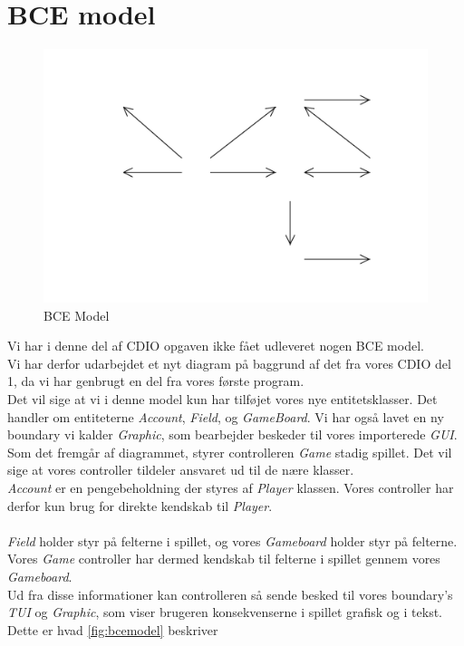 \section{BCE model}
\begin{figure}[ht]
\centering
\includegraphics[width=1\textwidth]{BCEModel.pdf}
\caption[<Text for the list of figures>]{BCE Model}
\label{fig:bcemodel}
\end{figure}
Vi har i denne del af CDIO opgaven ikke fået udleveret nogen BCE model.
\\
Vi har derfor udarbejdet et nyt diagram på baggrund af det fra vores CDIO del 1, da vi har genbrugt en del fra vores første program.
\\
Det vil sige at vi i denne model kun har tilføjet vores nye entitetsklasser. Det handler om entiteterne \textit{Account}, \textit{Field}, og \textit{GameBoard}. Vi har også lavet en ny boundary vi kalder \textit{Graphic}, som bearbejder beskeder til vores importerede \textit{GUI}.
\\
Som det fremgår af diagrammet, styrer controlleren \textit{Game} stadig spillet. Det vil sige at vores controller tildeler ansvaret ud til de nære klasser.
\\
\textit{Account} er en pengebeholdning der styres af \textit{Player} klassen. Vores controller har derfor kun brug for direkte kendskab til \textit{Player}.
\\\\
\textit{Field} holder styr på felterne i spillet, og vores \textit{Gameboard} holder styr på felterne. Vores \textit{Game} controller har dermed kendskab til felterne i spillet gennem vores \textit{Gameboard}.
\\


Ud fra disse informationer kan controlleren så sende besked til vores boundary's \textit{TUI} og \textit{Graphic}, som viser brugeren konsekvenserne i spillet grafisk og i tekst. Dette er hvad \vref{fig:bcemodel} beskriver